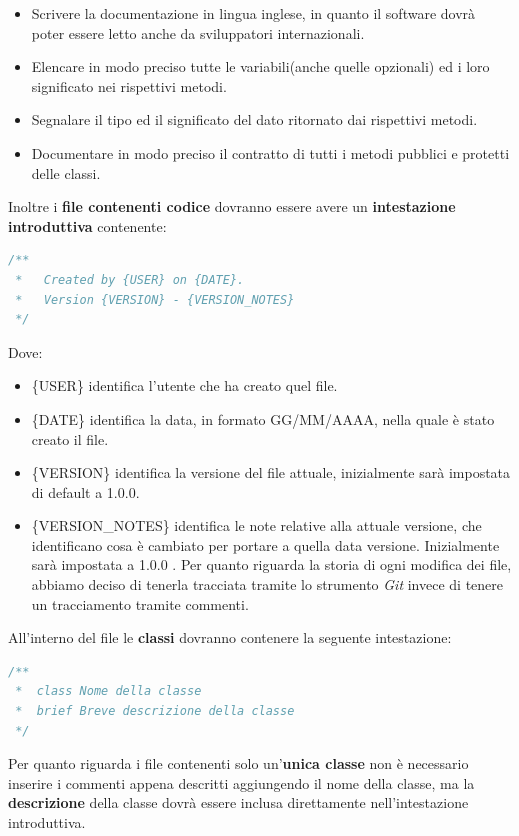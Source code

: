 \begin{itemize}
\item Scrivere la documentazione in lingua inglese, in quanto il software dovrà poter essere letto anche da sviluppatori internazionali.
\item Elencare in modo preciso tutte le variabili(anche quelle opzionali) ed i loro significato nei rispettivi metodi.
\item Segnalare il tipo ed il significato del dato ritornato dai rispettivi metodi.
\item Documentare in modo preciso il contratto di tutti i metodi pubblici e protetti delle classi.
\end{itemize}
Inoltre i \textbf{file contenenti codice} dovranno essere avere un \textbf{intestazione introduttiva} contenente:

\begin{lstlisting}[language=JavaScript]
/** 
 *   Created by {USER} on {DATE}.
 *   Version {VERSION} - {VERSION_NOTES}
 */
\end{lstlisting}
Dove:
\begin{itemize}
\item \{USER\} identifica l'utente che ha creato quel file.
\item \{DATE\} identifica la data, in formato GG/MM/AAAA, nella quale è stato creato il file.
\item \{VERSION\} identifica la versione del file attuale, inizialmente sarà impostata di default a 1.0.0.
\item \{VERSION\_NOTES\} identifica le note relative alla attuale versione, che identificano cosa è cambiato per portare a quella data versione. Inizialmente sarà impostata a 1.0.0 .
Per quanto riguarda la storia di ogni modifica dei file, abbiamo deciso di tenerla tracciata tramite lo strumento \textit{Git} invece di tenere un tracciamento tramite commenti.
\end{itemize}



All'interno del file le \textbf{classi} dovranno contenere la seguente intestazione:

\begin{lstlisting}[language=JavaScript]
/**
 *  class Nome della classe
 *  brief Breve descrizione della classe
 */
\end{lstlisting}

Per quanto riguarda i file contenenti solo un'\textbf{unica classe} non è necessario inserire i commenti appena descritti aggiungendo il nome della classe, ma la \textbf{descrizione} della classe dovrà essere inclusa direttamente nell'intestazione introduttiva.
\\



